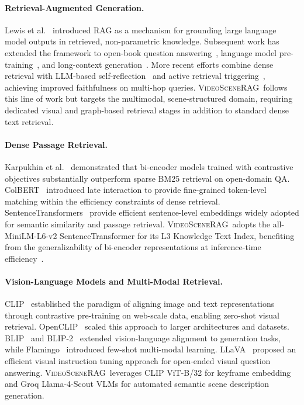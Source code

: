 \documentclass[11pt]{article}
\newcommand{\system}{\textsc{VideoSceneRAG}}
\begin{document}
\paragraph{Retrieval-Augmented Generation.}
Lewis et al.~\cite{rag} introduced RAG as a mechanism for grounding large
language model outputs in retrieved, non-parametric knowledge.  Subsequent
work has extended the framework to open-book question answering~\cite{fid},
language model pre-training~\cite{realm}, and long-context
generation~\cite{retro}.  More recent efforts combine dense retrieval with
LLM-based self-reflection~\cite{selfrag} and active retrieval
triggering~\cite{flare}, achieving improved faithfulness on multi-hop queries.
\system\ follows this line of work but targets the multimodal,
scene-structured domain, requiring dedicated visual and graph-based retrieval
stages in addition to standard dense text retrieval.

\paragraph{Dense Passage Retrieval.}
Karpukhin et al.~\cite{dpr} demonstrated that bi-encoder models trained with
contrastive objectives substantially outperform sparse BM25 retrieval on
open-domain QA\@.  ColBERT~\cite{colbert} introduced late interaction to
provide fine-grained token-level matching within the efficiency constraints of
dense retrieval.  SentenceTransformers~\cite{sbert} provide efficient
sentence-level embeddings widely adopted for semantic similarity and passage
retrieval.  \system\ adopts the all-MiniLM-L6-v2 SentenceTransformer for its
L3 Knowledge Text Index, benefiting from the generalizability of bi-encoder
representations at inference-time efficiency~\cite{ir_book}.

\paragraph{Vision-Language Models and Multi-Modal Retrieval.}
CLIP~\cite{clip} established the paradigm of aligning image and text
representations through contrastive pre-training on web-scale data, enabling
zero-shot visual retrieval.  OpenCLIP~\cite{openclip} scaled this approach to
larger architectures and datasets.  BLIP~\cite{blip} and BLIP-2~\cite{blip2}
extended vision-language alignment to generation tasks, while
Flamingo~\cite{flamingo} introduced few-shot multi-modal learning.
LLaVA~\cite{llava} proposed an efficient visual instruction tuning approach
for open-ended visual question answering.  \system\ leverages CLIP ViT-B/32
for keyframe embedding and Groq Llama-4-Scout VLMs for automated semantic
scene description generation.
\end{document}
